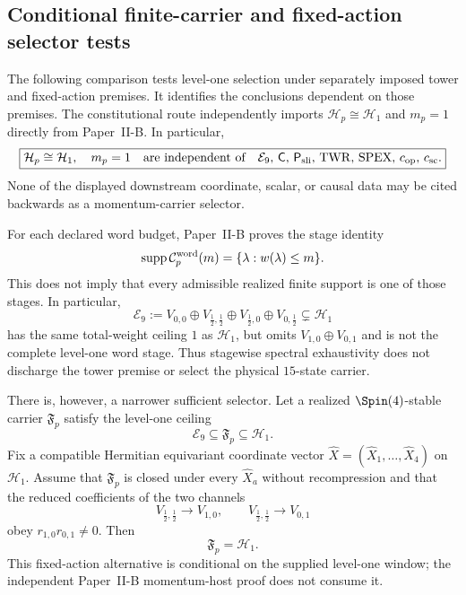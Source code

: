 \documentclass[11pt,a4paper]{article}
\begin{document}
\subsection{Conditional finite-carrier and fixed-action selector tests}
\label{p3a:app:legacy-selector}
The following comparison tests level-one selection under separately
imposed tower and fixed-action premises. It identifies the conclusions
dependent on those premises. The constitutional route independently imports
$\mathcal H_p\cong\mathcal H_1$ and $m_p=1$ directly from Paper~II-B.
In particular,
\[
 \boxed{
 \mathcal H_p\cong\mathcal H_1,\quad m_p=1
 \quad\text{are independent of}\quad
 \mathcal E_9,\,\mathsf C,\,\mathsf P_{\rm sli},\,
 \mathrm{TWR},\,\mathrm{SPEX},\,c_{\rm op},\,c_{\rm sc}.}
\]
None of the displayed downstream coordinate, scalar, or causal data may be
cited backwards as a momentum-carrier selector.

\begin{proposition}
\label{p3a:prop:finite-carrier-selector-boundary}
For each declared word budget, Paper~II-B proves the stage identity
\[
 \operatorname{supp}\mathcal C_p^{\rm word}(m)
 =\{\lambda:w(\lambda)\le m\}.
\]
This does not imply that every admissible realized finite support is one of
those stages.  In particular,
\[
 \mathcal E_9
 :=V_{0,0}\oplus V_{\frac12,\frac12}
   \oplus V_{\frac12,0}\oplus V_{0,\frac12}
 \subsetneq\mathcal H_1
\]
has the same total-weight ceiling \(1\) as \(\mathcal H_1\), but omits
\(V_{1,0}\oplus V_{0,1}\) and is not the complete level-one word stage.
Thus stagewise spectral exhaustivity does not discharge the tower premise or
select the physical \(15\)-state carrier.

There is, however, a narrower sufficient selector.  Let a realized
\(\Spin(4)\)-stable carrier \(\mathfrak F_p\) satisfy the level-one ceiling
\[
 \mathcal E_9\subseteq\mathfrak F_p\subseteq\mathcal H_1.
\]
Fix a compatible Hermitian equivariant coordinate vector
\(\widehat X=(\widehat X_1,\ldots,\widehat X_4)\) on \(\mathcal H_1\).
Assume that \(\mathfrak F_p\) is closed under every \(\widehat X_a\) without
recompression and that the reduced coefficients of the two channels
\[
 V_{\frac12,\frac12}\longrightarrow V_{1,0},
 \qquad
 V_{\frac12,\frac12}\longrightarrow V_{0,1}
\]
obey \(r_{1,0}r_{0,1}\ne0\).  Then
\[
 \mathfrak F_p=\mathcal H_1.
\]
This fixed-action alternative is conditional on the supplied level-one window; the independent Paper~II-B momentum-host proof does not consume it.
\end{proposition}
\end{document}
